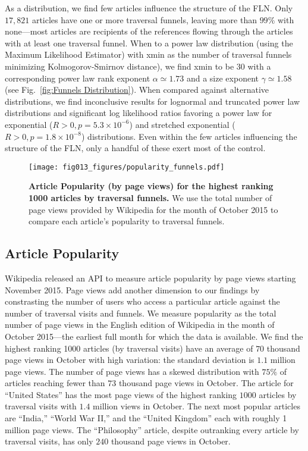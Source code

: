 \documentclass[pre,twocolumn,twoside,superscriptaddress,floatfix]{revtex4-1}
\begin{document}
{\begin{figure}[tp!]
\end{figure}
As a distribution, we find few articles influence the structure of the 
FLN. Only $17, 821$ articles have one or more traversal funnels, leaving
more than $99\%$ with none---most articles are recipients of 
the references flowing through the articles with at least one traversal funnel.
When to a power law 
    distribution (using the Maximum Likelihood Estimator) with xmin as the number of traversal funnels minimizing Kolmogorov-Smirnov distance), we find xmin to be 30 with a corresponding power law rank exponent $\alpha \simeq 1.73$ and a size exponent $\gamma \simeq 1.58$
(see Fig.~\ref{fig:Funnels Distribution}). 
When compared against alternative distributions, we find inconclusive results for lognormal and truncated power law distributions and significant log likelihood ratios favoring a power law for exponential ($R>0, p=5.3\times10^{-6}$) and stretched exponential ($R>0, p = 1.8\times10^{-8}$) distributions.
Even within the few articles
influencing the structure of the FLN, only a handful of these exert most of the 
control. 

\begin{figure}[tp!]
  \texttt{[image: fig013\_figures/popularity\_funnels.pdf]}
  \caption{
\textbf{Article Popularity (by page views) for the highest ranking 1000 articles by traversal funnels.}
We use the total number of page views provided by Wikipedia for the month
of October 2015 to compare each article's popularity to traversal funnels.
}
  \label{fig:Views and Funnels}
\end{figure}
\subsection{Article Popularity}

Wikipedia released an API to measure article popularity by page views
starting November 2015. 
Page views add another dimension to our
findings by constrasting
the number of users who access a particular article against
the number of traversal visits and funnels.
We measure popularity as the total number 
of page views in the English edition of Wikipedia in the month of 
October 2015---the earliest full month for which the data is available. 
We find the highest ranking 1000 articles (by traversal visits) have an average of
$70$ thousand page views in October with high variation: the standard deviation 
is $1.1$ million page views. 
The number of page views has a skewed distribution with $75\%$ of articles
reaching fewer than $73$ thousand page views in October.
The article for ``United States'' has the most page 
views of the highest ranking $1000$ articles by traversal visits with 
$1.4$ million views in October. The next most popular articles are 
``India,'' ``World War II,'' and the ``United Kingdom'' each with roughly 1 million page views. 
The ``Philosophy'' article, despite outranking every article by traversal visits,
has only $240$ thousand page views in October.

}
\end{document}
